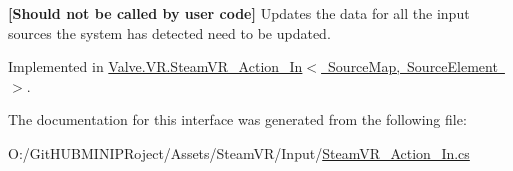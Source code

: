 {\bfseries{\mbox{[}Should not be called by user code\mbox{]}}} Updates the data for all the input sources the system has detected need to be updated. 



Implemented in \mbox{\hyperlink{class_valve_1_1_v_r_1_1_steam_v_r___action___in_ac2e658d37dcdb843a0cff2e62cbd84cf}{Valve.\+V\+R.\+Steam\+V\+R\+\_\+\+Action\+\_\+\+In$<$ Source\+Map, Source\+Element $>$}}.



The documentation for this interface was generated from the following file\+:\begin{DoxyCompactItemize}
\item 
O\+:/\+Git\+H\+U\+B\+M\+I\+N\+I\+P\+Roject/\+Assets/\+Steam\+V\+R/\+Input/\mbox{\hyperlink{_steam_v_r___action___in_8cs}{Steam\+V\+R\+\_\+\+Action\+\_\+\+In.\+cs}}\end{DoxyCompactItemize}
